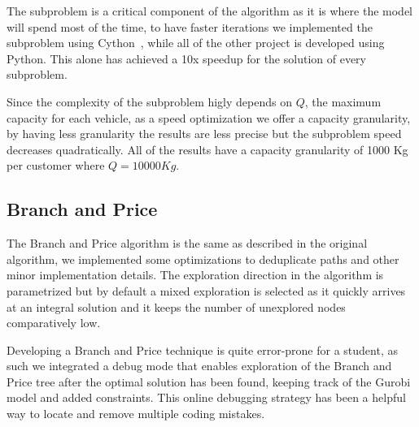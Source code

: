 The subproblem is a critical component of the algorithm as it is where the model will spend most of the time, to have faster iterations we implemented the subproblem using Cython~\cite{behnel2011cython}, while all of the other project is developed using Python. This alone has achieved a 10x speedup for the solution of every subproblem.

Since the complexity of the subproblem higly depends on $Q$, the maximum capacity for each vehicle, as a speed optimization we offer a capacity granularity, by having less granularity the results are less precise but the subproblem speed decreases quadratically. All of the results have a capacity granularity of 1000 Kg per customer where $Q = 10000Kg$.

\subsection{Branch and Price}
The Branch and Price algorithm is the same as described in the original algorithm, we implemented some optimizations to deduplicate paths and other minor implementation details. The exploration direction in the algorithm is parametrized but by default a mixed exploration is selected as it quickly arrives at an integral solution and it keeps the number of unexplored nodes comparatively low.

Developing a Branch and Price technique is quite error-prone for a student, as such we integrated a debug mode that enables exploration of the Branch and Price tree after the optimal solution has been found, keeping track of the Gurobi model and added constraints. This online debugging strategy has been a helpful way to locate and remove multiple coding mistakes.
